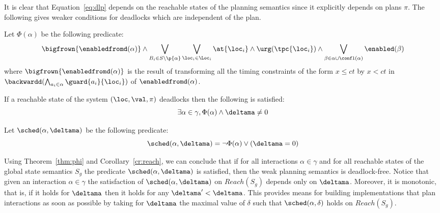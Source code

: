  It is clear that Equation~\ref{eq:dlp} depends on the reachable states of the planning semantics since it explicitly depends on plans $\pi$.
  The following gives weaker conditions for deadlocks which are independent of the plan. 
  \begin{theorem}\label{thm:phi}
    Let $\Phi(\alpha)$ be the following predicate:
    \begin{equation}\label{eq:phi}
      \bigfrown{\enabledfromd(\alpha)}\wedge
      \bigvee_{B_i\in S\setminus\p{\alpha}}\bigvee_{\loc_i\in\Loc_i}\at{\loc_i}\wedge\urg(\tpc{\loc_i})
    \wedge\bigvee_{\beta\in\alpha\cup\confl(\alpha)}\enabled(\beta)
  \end{equation}
  where $\bigfrown{\enabledfromd(\alpha)}$ is the result of transforming all the timing constraints of the form $x\le ct$ by $x<ct$
  in $\backwardd(\bigwedge_{a_i\in\alpha}\guard{a_i}{\loc_i})$ of $\enabledfromd(\alpha)$.
  
  If a reachable state of the system $(\loc,\val,\pi)$ deadlocks then the following is satisfied:
  \begin{equation}\label{eq:dlpf}
      \exists\alpha\in\gamma, \Phi(\alpha)\wedge\deltama\neq0
  \end{equation}
  \end{theorem}
 
  Let $\sched(\alpha,\deltama)$ be the following predicate:
  \begin{displaymath}
    \sched(\alpha,\deltama) = \neg\Phi(\alpha)\vee(\deltama=0)
  \end{displaymath}

  Using Theorem~\ref{thm:phi} and Corollary~\ref{cr:reach}, we can conclude that if for all interactions $\alpha\in\gamma$ and for all reachable states of the global state semantics $S_g$ the predicate $\sched(\alpha,\deltama)$ is satisfied, then the weak planning semantics is deadlock-free.
  Notice that given an interaction $\alpha \in \gamma$ the satisfaction of $\sched(\alpha,\deltama)$ on $Reach(S_g)$ depends only on $\deltama$.
  Moreover, it is monotonic, that is, if it holds for $\deltama$ then it holds for any $\deltama' < \deltama$.
  This provides means for building implementations that plan interactions as soon as possible by taking for $\deltama$ the maximal value of $\delta$ such that $\sched(\alpha,\delta)$ holds on $Reach(S_g)$.
  

